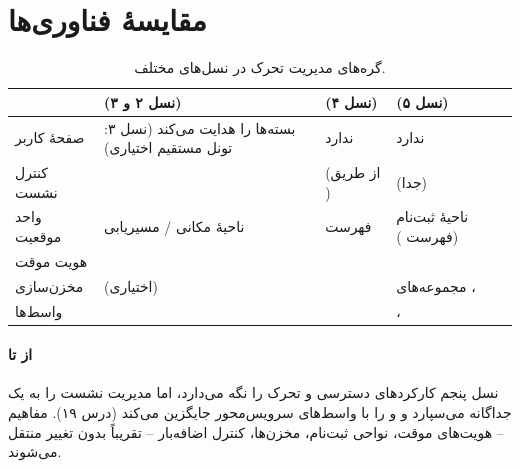 \documentclass[11pt,a4paper]{article}
\begin{document}
\section{مقایسهٔ فناوری‌ها}
\begin{table}[htbp]
\centering\small
\caption{گره‌های مدیریت تحرک در نسل‌های مختلف.}\label{tab:cmp}
\begin{tabularx}{\linewidth}{@{}l Y Y Y@{}}
\toprule
{} &  (نسل ۲ و ۳) &  (نسل ۴) &  (نسل ۵) \\
\midrule
صفحهٔ کاربر    &  بسته‌ها را هدایت می‌کند (نسل ۳: تونل مستقیم اختیاری) & ندارد & ندارد \\
کنترل نشست     &                            &  (از طریق ) &  (جدا) \\
واحد موقعیت    & ناحیهٔ مکانی / مسیریابی               & فهرست    & ناحیهٔ ثبت‌نام (فهرست ) \\
هویت موقت      &                     &   &  \\
مخزن‌سازی      &  (اختیاری)                &        & مجموعه‌های ،  \\
واسط‌ها        &                    &  & ،  \\
\bottomrule
\end{tabularx}
\end{table}

\paragraph{از  تا }  نسل پنجم کارکردهای دسترسی و تحرک  را نگه می‌دارد، اما مدیریت نشست را
به یک  جداگانه می‌سپارد و  و  را با واسط‌های سرویس‌محور جایگزین می‌کند (درس ۱۹).
مفاهیم -- هویت‌های موقت، نواحی ثبت‌نام، مخزن‌ها، کنترل اضافه‌بار -- تقریباً بدون تغییر منتقل می‌شوند.

\end{document}
